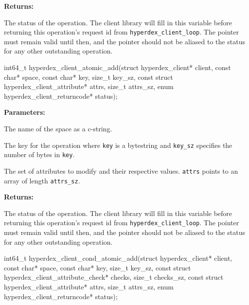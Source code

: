 \noindent\textbf{Returns:}
\begin{description}[labelindent=\widthof{{\texttt{status}}},leftmargin=*,noitemsep,nolistsep,align=right]
\item[\texttt{status}] The status of the operation.  The client library will fill in this variable before returning this operation's request id from \texttt{hyperdex\_client\_loop}.  The pointer must remain valid until then, and the pointer should not be aliased to the status for any other outstanding operation.
\end{description}

\funcsep
{}
\begin{ccode}
int64_t hyperdex_client_atomic_add(struct hyperdex_client* client,
                const char* space,
                const char* key, size_t key_sz,
                const struct hyperdex_client_attribute* attrs, size_t attrs_sz,
                enum hyperdex_client_returncode* status);
\end{ccode}
\funcdesc 

\noindent\textbf{Parameters:}
\begin{description}[labelindent=\widthof{{\texttt{attrs}, \texttt{attrs\_sz}}},leftmargin=*,noitemsep,nolistsep,align=right]
\item[\texttt{space}] The name of the space as a c-string.
\item[\texttt{key}, \texttt{key\_sz}] The key for the operation where \texttt{key} is a bytestring and \texttt{key\_sz} specifies the number of bytes in \texttt{key}.
\item[\texttt{attrs}, \texttt{attrs\_sz}] The set of attributes to modify and their respective values.  \texttt{attrs} points to an array of length \texttt{attrs\_sz}.
\end{description}

\noindent\textbf{Returns:}
\begin{description}[labelindent=\widthof{{\texttt{status}}},leftmargin=*,noitemsep,nolistsep,align=right]
\item[\texttt{status}] The status of the operation.  The client library will fill in this variable before returning this operation's request id from \texttt{hyperdex\_client\_loop}.  The pointer must remain valid until then, and the pointer should not be aliased to the status for any other outstanding operation.
\end{description}

\funcsep
{}
\begin{ccode}
int64_t hyperdex_client_cond_atomic_add(struct hyperdex_client* client,
                const char* space,
                const char* key, size_t key_sz,
                const struct hyperdex_client_attribute_check* checks, size_t checks_sz,
                const struct hyperdex_client_attribute* attrs, size_t attrs_sz,
                enum hyperdex_client_returncode* status);
\end{ccode}
\funcdesc 

